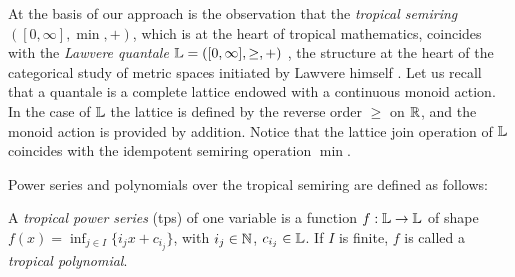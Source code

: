 %



At the basis of our approach is the observation that the \emph{tropical semiring} $([0,\infty], \min, +)$, which is at the heart of tropical mathematics, coincides with the \emph{Lawvere quantale} $\mathbb{L}=([0,\infty], \geq, +)$ \cite{Hofmann2014, Stubbe2014}, the structure at the heart of the categorical study of metric spaces initiated by Lawvere himself \cite{Lawvere1973}.
Let us recall that a quantale is a complete lattice endowed with a continuous monoid action. In the case of $\mathbb{L}$ the lattice is defined by the reverse order $\geq$ on $\mathbb{R}$, and the monoid action is provided by addition. Notice that the lattice join operation of $\mathbb{L}$ coincides with the idempotent semiring operation $\min$. 




Power series and polynomials over the tropical semiring are defined as follows:


\begin{definition}
A \emph{tropical power series}
(tps) of one variable is a function $f:\mathbb{L}\to\mathbb{L}$ of shape $f(x)=\inf_{j\in I}\{i_j x+c_{i_{j}}\}$, with $i_{j}\in\mathbb{N}$, $c_{i_{j}}\in\mathbb{L}$.
If $I$ is finite, $f$ is called a \emph{tropical polynomial}. 
\end{definition}

